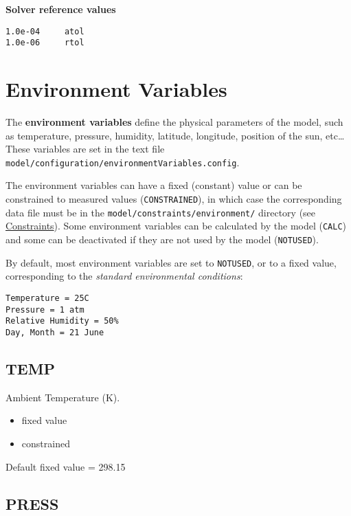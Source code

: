 \textbf{Solver reference values}

\begin{verbatim}
1.0e-04     atol
1.0e-06     rtol
\end{verbatim}

\section{Environment Variables} \label{sec:environment-variables}

The \textbf{environment variables} define the physical parameters of
the model, such as temperature, pressure, humidity, latitude,
longitude, position of the sun, etc\ldots{} These variables are set in
the text file\\
\texttt{model/configuration/environmentVariables.config}.

The environment variables can have a fixed (constant) value or can be
constrained to measured values (\texttt{CONSTRAINED}), in which case
the corresponding data file must be in the
\texttt{model/constraints/environment/} directory (see
\hyperref[sec:constraints]{Constraints}). Some environment variables
can be calculated by the model (\texttt{CALC}) and some can be
deactivated if they are not used by the model (\texttt{NOTUSED}).

By default, most environment variables are set to \texttt{NOTUSED}, or
to a fixed value, corresponding to the \emph{standard environmental
  conditions}:

\begin{verbatim}
Temperature = 25C
Pressure = 1 atm
Relative Humidity = 50%
Day, Month = 21 June
\end{verbatim}

\subsection{TEMP} \label{subsec:temp}

Ambient Temperature (K).

\begin{itemize}
\item fixed value
\item constrained
\end{itemize}

Default fixed value = 298.15

\subsection{PRESS} \label{subsec:press}

